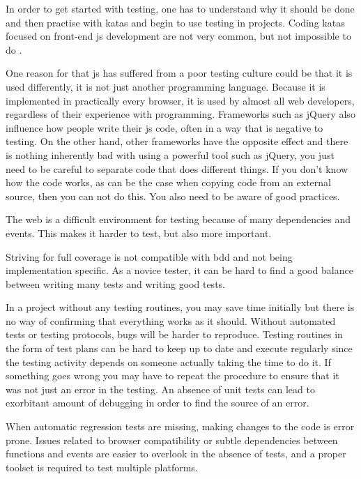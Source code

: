 \documentclass[11pt]{article}
\begin{document}
In order to get started with testing, one has to understand why it should be done \cite[question~38]{Edelstam} and then practise with katas and begin to use testing in projects. Coding katas focused on front-end \gls{js} development are not very common, but not impossible to do \cite[question~47]{Ahnve}.

One reason for that \gls{js} has suffered from a poor testing culture could be that it is used differently, it is not just another programming language. Because it is implemented in practically every browser, it is used by almost all web developers, regardless of their experience with programming. Frameworks such as jQuery also influence how people write their \gls{js} code, often in a way that is negative to testing. On the other hand, other frameworks have the opposite effect and there is nothing inherently bad with using a powerful tool such as jQuery, you just need to be careful to separate code that does different things. If you don't know how the code works, as can be the case when copying code from an external source, then you can not do this. You also need to be aware of good practices.

The web is a difficult environment for testing because of many dependencies and events. This makes it harder to test, but also more important.

Striving for full coverage is not compatible with \gls{bdd} and not being implementation specific. As a novice tester, it can be hard to find a good balance between writing many tests and writing good tests.

In a project without any testing routines, you may save time initially but there is no way of confirming that everything works as it should. Without automated tests or testing protocols, bugs will be harder to reproduce. Testing routines in the form of test plans can be hard to keep up to date and execute regularly since the testing activity depends on someone actually taking the time to do it. If something goes wrong you may have to repeat the procedure to ensure that it was not just an error in the testing. An absence of unit tests can lead to exorbitant amount of debugging in order to find the source of an error.

When automatic regression tests are missing, making changes to the code is error prone. Issues related to browser compatibility or subtle dependencies between functions and events are easier to overlook in the absence of tests, and a proper toolset is required to test multiple platforms.
\end{document}
